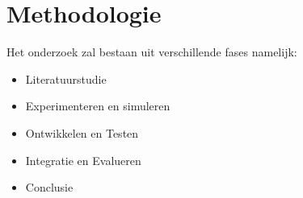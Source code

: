 

\section{Methodologie}%
\label{sec:methodologie}


Het onderzoek zal bestaan uit verschillende fases namelijk:
    \begin{itemize}
        \item Literatuurstudie
        \item Experimenteren en simuleren
        \item Ontwikkelen en Testen
        \item Integratie en Evalueren
        \item Conclusie
    \end{itemize}

